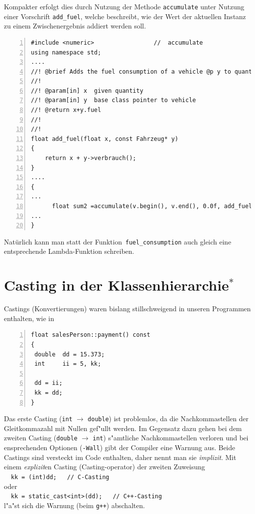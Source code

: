 Kompakter erfolgt dies durch Nutzung der Methode \texttt{accumulate} unter Nutzung einer  
Vorschrift \texttt{add\_fuel}, 
welche beschreibt, wie der Wert der aktuellen Instanz zu einem Zwischenergebnis addiert werden soll.
\begin{lstlisting}[caption={Gesamverbrauch - via \texttt{accumulate}},label=lst:pstl_7,
basicstyle=\scriptsize,numbers=left, numberstyle=\tiny, stepnumber=2, numbersep=5pt]
#include <numeric>                 //  accumulate
using namespace std;
....
//! @brief Adds the fuel consumption of a vehicle @p y to quantity @p x
//!
//! @param[in] x  given quantity
//! @param[in] y  base class pointer to vehicle
//! @return x+y.fuel
//!
//!
float add_fuel(float x, const Fahrzeug* y)
{
    return x + y->verbrauch();
}
....
{
...
      float sum2 =accumulate(v.begin(), v.end(), 0.0f, add_fuel);
...  
}
\end{lstlisting}

Natürlich kann man statt der Funktion~\texttt{fuel\_consumption} auch gleich eine entsprechende 
Lambda-Funktion schreiben.
%
%
\section{Casting in der Klassenhierarchie$\mbox{}^\ast$}
\label{sec:A4}
Castings (Konvertierungen) waren bislang stillschweigend in unseren Programmen
enthalten, wie in
\begin{lstlisting}[caption={Implizites Casting bei einfachen Datentypen.},label=lst:casting_implizit_1,
basicstyle=\scriptsize,numbers=left, numberstyle=\tiny, stepnumber=2, numbersep=5pt]
float salesPerson::payment() const
{
 double  dd = 15.373;
 int     ii = 5, kk;

 dd = ii;
 kk = dd;
}
\end{lstlisting}

%
Das erste Casting (\texttt{int} $\longrightarrow$ \texttt{double}) ist
problemlos, da die Nachkommastellen der Gleitkommazahl mit Nullen gef"ullt werden.
Im Gegensatz dazu gehen  bei dem zweiten Casting
(\texttt{double} $\longrightarrow$ \texttt{int})
s"amtliche Nachkommastellen verloren und bei ensprechenden Optionen (\verb|-Wall|)
gibt der Compiler eine Warnung aus. Beide Castings sind versteckt im Code
enthalten, daher nennt man sie \emph{implizit}.
Mit einem \emph{explizit}en Casting
(Casting-operator) der zweiten Zuweisung \\
\verb|  kk = (int)dd;   // C-Casting | \\ oder \\
\verb|  kk = static_cast<int>(dd);   // C++-Casting | \\
l"a"st sich die Warnung (beim \verb|g++|) abschalten.
%
%
